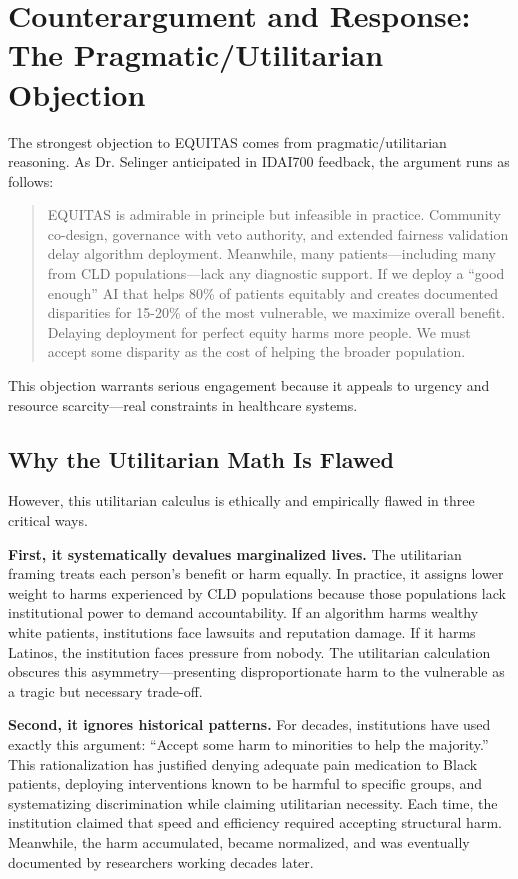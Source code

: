 \documentclass[12pt,a4paper]{article}
\begin{document}
\section{Counterargument and Response: The Pragmatic/Utilitarian Objection}

The strongest objection to EQUITAS comes from pragmatic/utilitarian reasoning. As Dr. Selinger anticipated in IDAI700 feedback, the argument runs as follows:

\blockquote{EQUITAS is admirable in principle but infeasible in practice. Community co-design, governance with veto authority, and extended fairness validation delay algorithm deployment. Meanwhile, many patients---including many from CLD populations---lack any diagnostic support. If we deploy a ``good enough'' AI that helps 80\% of patients equitably and creates documented disparities for 15-20\% of the most vulnerable, we maximize overall benefit. Delaying deployment for perfect equity harms more people. We must accept some disparity as the cost of helping the broader population.}

This objection warrants serious engagement because it appeals to urgency and resource scarcity---real constraints in healthcare systems.

\subsection{Why the Utilitarian Math Is Flawed}

However, this utilitarian calculus is ethically and empirically flawed in three critical ways.

\textbf{First, it systematically devalues marginalized lives.} The utilitarian framing treats each person's benefit or harm equally. In practice, it assigns lower weight to harms experienced by CLD populations because those populations lack institutional power to demand accountability. If an algorithm harms wealthy white patients, institutions face lawsuits and reputation damage. If it harms Latinos, the institution faces pressure from nobody. The utilitarian calculation obscures this asymmetry---presenting disproportionate harm to the vulnerable as a tragic but necessary trade-off.

\textbf{Second, it ignores historical patterns.} For decades, institutions have used exactly this argument: ``Accept some harm to minorities to help the majority.'' This rationalization has justified denying adequate pain medication to Black patients, deploying interventions known to be harmful to specific groups, and systematizing discrimination while claiming utilitarian necessity. Each time, the institution claimed that speed and efficiency required accepting structural harm. Meanwhile, the harm accumulated, became normalized, and was eventually documented by researchers working decades later.
\end{document}
